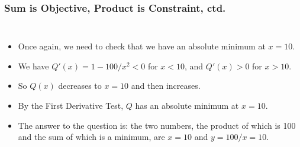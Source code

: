 \documentclass[serif,ignorenonframetext]{beamer}
\begin{document}
\begin{frame}
  \frametitle{Sum is Objective, Product is Constraint, ctd.}
  \begin{columns}
  \begin{itemize}[<+->]
  \item Once again, we need to check that we have an absolute minimum
    at $x=10$.
  \item We have $Q'(x)=1-100/x^2 <0$ for $x<10$, and $Q'(x)>0$ for $x>10$.
  \item So $Q(x)$ decreases to $x=10$ and then increases.
  \item By the First Derivative Test, $Q$ has an absolute minimum
    at $x=10$.
  \item The answer to the question is: the two numbers, the product of which 
    is 100 and the sum of which is a minimum, are $x=10$ and $y=100/x=10$.
  \end{itemize}
  \end{columns}
\end{frame}
\end{document}
